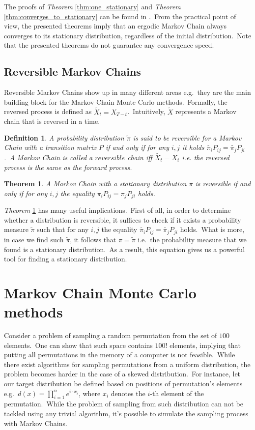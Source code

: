 \documentclass[a4paper, 11pt, onecolumn, openany, titlepage]{report}
\newcommand\numberedchapter[1]{\setlength\topskip{3cm}\chapter{#1}\setlength\topskip{0cm}}
\theoremstyle{default_theorem_style}\newtheorem{theorem}{Theorem}
\theoremstyle{default_theorem_style}\newtheorem{definition}{Definition}
\begin{document}
The proofs of \textit{Theorem} \ref{thm:one_stationary} and \textit{Theorem} \ref{thm:converges_to_stationary} can
be found in \cite{markov_chains_book}.\ From the practical point of view, the presented theorems imply that an
ergodic Markov Chain always converges to its stationary distribution, regardless of the initial
distribution.\ Note that the presented theorems do not guarantee any convergence speed.

\section{Reversible Markov Chains}

Reversible Markov Chains show up in many different areas e.g.\ they are the main building block for the Markov
Chain Monte Carlo methods.\ Formally, the reversed process is defined as $\tilde{X_t} = X_{T - t}$.\ Intuitively,
$\tilde{X}$ represents a Markov chain that is reversed in a time.

\begin{definition}
A probability distribution $\tilde{\pi}$ is said to be \textit{reversible} for a Markov Chain with a transition
matrix $P$ if and only if for any $i,j$ it holds $\tilde{\pi_i} P_{ij} = \tilde{\pi_j} P_{ji}$.\ A Markov Chain
is called a $reversible$ chain iff $\tilde{X_t} = X_t$ i.e. the reversed process is the same as the forward process.
\end{definition}

\begin{theorem}\label{reversible_chain}
A Markov Chain with a stationary distribution $\pi$ is reversible if and only if for any $i, j$ the equality
$\pi_i P_{ij} = \pi_j P_{ji}$ holds.
\end{theorem}

\textit{Theorem} \ref{reversible_chain} has many useful implications.\ First of all, in order to determine whether
a distribution is reversible, it suffices to check if it exists a probability measure $\tilde{\pi}$ such that
for any $i, j$ the equality $\tilde{\pi_i} P_{ij} = \tilde{\pi_j} P_{ji}$ holds.\ What is more, in case we find such
$\tilde{\pi}$, it follows that $\pi = \tilde{\pi}$ i.e.\ the probability measure that we found is a stationary
distribution.\ As a result, this equation gives us a powerful tool for finding a stationary distribution.

\numberedchapter{Markov Chain Monte Carlo methods}\label{chapter:mcmc}

Consider a problem of sampling a random permutation from the set of $100$ elements.\ One can show that such space
contains $100!$ elements, implying that putting all permutations in the memory of a computer is not feasible.\ While
there exist algorithms for sampling permutations from a uniform distribution, the problem becomes harder in the case of
a skewed distribution.\ For instance, let our target distribution be defined based on positions of permutation's
elements e.g.\ $d(x) = \prod_{i = 1}^{n} e^{i \cdot x_i}$, where $x_i$ denotes the $i$-th element of the
permutation.\ While the problem of sampling from such distribution can not be tackled using any trivial algorithm,
it's possible to simulate the sampling process with Markov Chains.\newline
\end{document}
